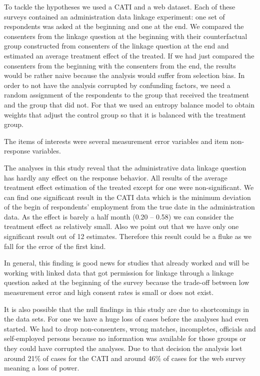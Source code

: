 To tackle the hypotheses we used a CATI and a web dataset. Each of these surveys contained an administration data linkage experiment: one set of respondents was asked at the beginning and one at the end. We compared the consenters from the linkage question at the beginning with their counterfactual group constructed from consenters of the linkage question at the end and estimated an average treatment effect of the treated. If we had just compared the consenters from the beginning with the consenters from the end, the results would be rather naive because the analysis would suffer from selection bias. In order to not have the analysis corrupted by confunding factors, we need a random assignment of the respondents to the group that received the treatment and the group that did not. For that we used an entropy balance model to obtain weights that adjust the control group so that it is balanced with the treatment group.

The items of interests were several measurement error variables and item non-response variables.

The analyses in this study reveal that the administrative data linkage question has hardly any effect on the response behavior. All results of the average treatment effect estimation of the treated except for one were non-significant. We can find one significant result in the CATI data which is the minimum deviation of the begin of respondents' employment from the true date in the administration data. As the effect is barely a half month (0.20 -- 0.58) we can consider the treatment effect as relatively small. Also we point out that we have only one significant result out of 12 estimates. Therefore this result could be a fluke as we fall for the error of the first kind.

In general, this finding is good news for studies that already worked and will be working with linked data that got permission for linkage through a linkage question asked at the beginning of the survey because the trade-off between low measurement error and high consent rates is small or does not exist.

It is also possible that the null findings in this study are due to shortcomings in the data sets. For one we have a huge loss of cases before the analyses had even started. We had to drop non-consenters, wrong matches, incompletes, officials and self-employed persons because no information was available for those groups or they could have corrupted the analyses. Due to that decision the analysis lost around 21\% of cases for the CATI and around 46\% of cases for the web survey meaning a loss of power.

